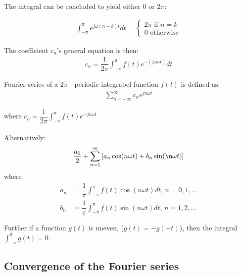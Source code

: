 The integral can be concluded to yield either $0$ or $2\pi$:

\begin{align}
	\int_{-\pi}^{\pi} e^{j \omega (n-k)t}dt 
	= 
	\begin{cases}
			2\pi \text{ if } n=k\\
			0 \text{ otherwise}
	\end{cases}
\end{align}

The coefficient $c_n$'s general equation is then:
\begin{align*}
	c_n = \dfrac{1}{2\pi} \int_{-\pi}^{\pi} f(t) e^{-(j \omega nt)}dt
\end{align*} 

\begin{definition}
Fourier series of a $2\pi$ - periodic integrabel function $f(t)$ is defined as:
\begin{align*}
	\sum_{n=-\infty}^\infty c_n e^{j n \omega t}
\end{align*}

where $c_n = \dfrac{1}{2\pi}\int_{- \pi}^\pi f(t) e^{-j n \omega t}$
\\\\
Alternatively:
\begin{align*}
	\dfrac{a_0}{2} + \sum_{n=1}^\infty \left[ a_n \cos(n \omega t) + b_n \sin(\n \omega t)\right]
\end{align*} 
where
\begin{align*}
	a_n 
	&= \dfrac{1}{\pi} \int_{-\pi}^\pi f(t) \cos (n \omega t) dt, \, n=0,1,\dots\\
	b_n
	&= \dfrac{1}{\pi} \int_{-\pi}^\pi f(t) \sin (n \omega t) dt, \, n=1,2,\dots	
\end{align*}
\end{definition}

Further if a function $g(t)$ is uneven, ($g(t) = -g(-t)$), then the integral $\int_{-\pi}^\pi g(t) = 0$.

\subsection{Convergence of the Fourier series}

